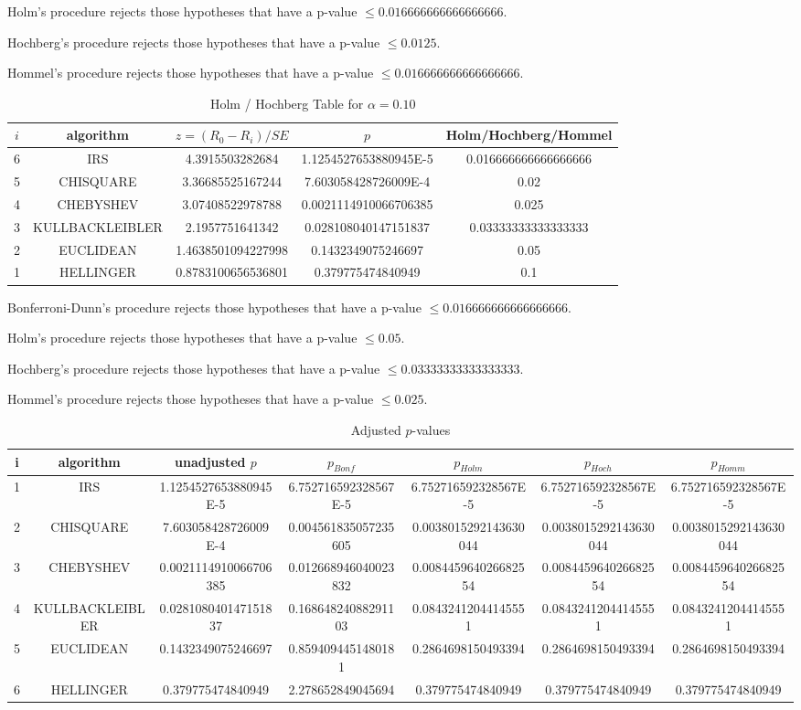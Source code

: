 \documentclass[a4paper,10pt]{article}
\begin{document}
\begin{landscape}
Holm's procedure rejects those hypotheses that have a p-value $\le0.016666666666666666$.


Hochberg's procedure rejects those hypotheses that have a p-value $\le0.0125$.


Hommel's procedure rejects those hypotheses that have a p-value $\le0.016666666666666666$.


\begin{table}[!htp]
\centering\tiny
\caption{Holm / Hochberg Table for $\alpha=0.10$}
\begin{tabular}{ccccc}
$i$&algorithm&$z=(R_0 - R_i)/SE$&$p$&Holm/Hochberg/Hommel\\
\hline
6&IRS&4.3915503282684&1.1254527653880945E-5&0.016666666666666666\\
5&CHISQUARE&3.36685525167244&7.603058428726009E-4&0.02\\
4&CHEBYSHEV&3.07408522978788&0.0021114910066706385&0.025\\
3&KULLBACKLEIBLER&2.1957751641342&0.028108040147151837&0.03333333333333333\\
2&EUCLIDEAN&1.4638501094227998&0.1432349075246697&0.05\\
1&HELLINGER&0.8783100656536801&0.379775474840949&0.1\\
\hline
\end{tabular}
\end{table}
Bonferroni-Dunn's procedure rejects those hypotheses that have a p-value $\le0.016666666666666666$.


Holm's procedure rejects those hypotheses that have a p-value $\le0.05$.


Hochberg's procedure rejects those hypotheses that have a p-value $\le0.03333333333333333$.


Hommel's procedure rejects those hypotheses that have a p-value $\le0.025$.


\begin{table}[!htp]
\centering\tiny
\caption{Adjusted $p$-values}
\begin{tabular}{ccccccc}
i&algorithm&unadjusted $p$&$p_{Bonf}$&$p_{Holm}$&$p_{Hoch}$&$p_{Homm}$\\
\hline
1&IRS&1.1254527653880945E-5&6.752716592328567E-5&6.752716592328567E-5&6.752716592328567E-5&6.752716592328567E-5\\
2&CHISQUARE&7.603058428726009E-4&0.004561835057235605&0.0038015292143630044&0.0038015292143630044&0.0038015292143630044\\
3&CHEBYSHEV&0.0021114910066706385&0.012668946040023832&0.008445964026682554&0.008445964026682554&0.008445964026682554\\
4&KULLBACKLEIBLER&0.028108040147151837&0.16864824088291103&0.08432412044145551&0.08432412044145551&0.08432412044145551\\
5&EUCLIDEAN&0.1432349075246697&0.8594094451480181&0.2864698150493394&0.2864698150493394&0.2864698150493394\\
6&HELLINGER&0.379775474840949&2.278652849045694&0.379775474840949&0.379775474840949&0.379775474840949\\
\hline
\end{tabular}
\end{table}


\end{landscape}
\end{document}
